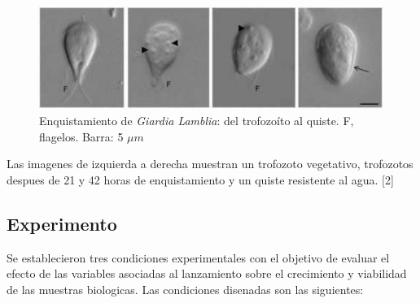     \begin{figure}[H]
      \centering
      \includegraphics[width=1\textwidth]{./image/Giardia/Enquistamiento.jpg}
      \caption{Enquistamiento de \textit{Giardia Lamblia}: del trofozoíto al quiste. F, flagelos. Barra: 5 $\mu m$}
      \label{fig:enquistamiento}
    \end{figure}

    Las imagenes de izquierda a derecha muestran un trofozoto vegetativo, trofozotos despues de 21 y
    42 horas de enquistamiento y un quiste resistente al agua. [2]

  \subsection{Experimento}
    Se establecieron tres condiciones experimentales con el objetivo de evaluar el efecto de las
    variables asociadas al lanzamiento sobre el crecimiento y viabilidad de las muestras biologicas.
    Las condiciones disenadas son las siguientes:
 
